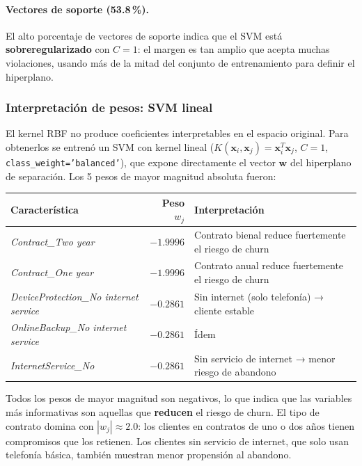 \documentclass[spanish]{article}
\begin{document}
\paragraph{Vectores de soporte (53.8\,\%).} El alto porcentaje de vectores de soporte indica que el SVM está \textbf{sobreregularizado} con $C=1$: el margen es tan amplio que acepta muchas violaciones, usando más de la mitad del conjunto de entrenamiento para definir el hiperplano.

\subsubsection{Interpretación de pesos: SVM lineal}

El kernel RBF no produce coeficientes interpretables en el espacio original. Para obtenerlos se entrenó un SVM con kernel lineal ($K(\mathbf{x}_i,\mathbf{x}_j) = \mathbf{x}_i^T\mathbf{x}_j$, $C=1$, \texttt{class\_weight='balanced'}), que expone directamente el vector $\mathbf{w}$ del hiperplano de separación. Los 5 pesos de mayor magnitud absoluta fueron:

\begin{center}
\begin{tabular}{lrl}
\toprule
\textbf{Característica} & \textbf{Peso $w_j$} & \textbf{Interpretación} \\
\midrule
\textit{Contract\_Two year}                     & $-1.9996$ & Contrato bienal reduce fuertemente el riesgo de churn \\
\textit{Contract\_One year}                     & $-1.9996$ & Contrato anual reduce fuertemente el riesgo de churn \\
\textit{DeviceProtection\_No internet service}  & $-0.2861$ & Sin internet (solo telefonía) → cliente estable \\
\textit{OnlineBackup\_No internet service}      & $-0.2861$ & Ídem \\
\textit{InternetService\_No}                    & $-0.2861$ & Sin servicio de internet → menor riesgo de abandono \\
\bottomrule
\end{tabular}
\end{center}

Todos los pesos de mayor magnitud son negativos, lo que indica que las variables más informativas son aquellas que \textbf{reducen} el riesgo de churn. El tipo de contrato domina con $|w_j| \approx 2.0$: los clientes en contratos de uno o dos años tienen compromisos que los retienen. Los clientes sin servicio de internet, que solo usan telefonía básica, también muestran menor propensión al abandono.
\end{document}
